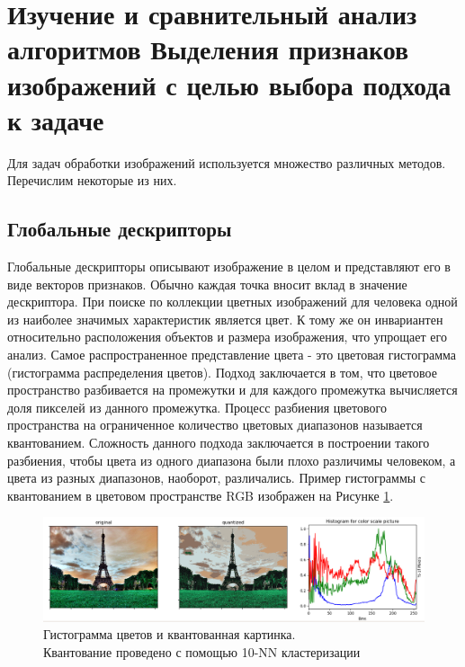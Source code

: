 \section{Изучение и сравнительный анализ алгоритмов Выделения признаков изображений с целью выбора подхода к задаче}

Для задач обработки изображений используется множество различных методов. Перечислим некоторые из них.

\subsection{Глобальные дескрипторы}

Глобальные дескрипторы описывают изображение в целом и представляют его в виде векторов признаков. Обычно каждая точка вносит вклад в значение дескриптора.
При поиске по коллекции цветных изображений для человека одной из наиболее значимых характеристик является цвет. К тому же он инвариантен относительно расположения объектов и размера изображения, что упрощает его анализ. Самое распространенное представление цвета - это цветовая гистограмма \cite{colorhist_2018} (гистограмма
распределения цветов). Подход заключается в том, что цветовое пространство разбивается
на промежутки и для каждого промежутка вычисляется доля пикселей из данного
промежутка. Процесс разбиения цветового пространства на ограниченное количество
цветовых диапазонов называется квантованием. Сложность данного подхода заключается
в построении такого разбиения, чтобы цвета из одного диапазона были плохо различимы
человеком, а цвета из разных диапазонов, наоборот, различались. Пример гистограммы с
квантованием в цветовом пространстве RGB изображен на Рисунке \ref{pic:exchist}.


\begin{figure}%
	\begin{center}
		\includegraphics[width=.9\columnwidth]{./img/hist_0}%
	\end{center}
	\caption{Гистограмма цветов и квантованная картинка.\\ Квантование проведено с помощью 10-NN кластеризации}%
	\label{pic:exchist}%
\end{figure}



